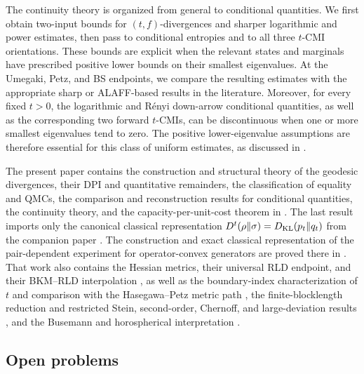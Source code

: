 \documentclass[11pt]{article}
\theoremstyle{remark}
\newcommand{\1}{\mathbbm{1}}
\begin{document}
The continuity theory is organized from general to conditional
quantities.  We first obtain two-input bounds for $(t,f)$-divergences
and sharper logarithmic and power estimates, then pass to conditional
entropies and to all three $t$-CMI orientations.  These bounds are
explicit when the relevant states and marginals have prescribed
positive lower bounds on their smallest eigenvalues.  At the Umegaki,
Petz, and BS endpoints, we compare the resulting estimates with the
appropriate sharp or ALAFF-based results in the literature.  Moreover,
for every fixed $t>0$, the logarithmic and R\'enyi down-arrow
conditional quantities, as well as the corresponding two forward
$t$-CMIs, can be discontinuous when one or more smallest eigenvalues
tend to zero.
The positive lower-eigenvalue assumptions are therefore essential for
this class of uniform estimates, as discussed in
.

The present paper contains the construction and structural theory of
the geodesic divergences, their DPI and quantitative remainders, the
classification of equality and QMCs, the comparison and reconstruction
results for conditional quantities, the continuity theory, and the
capacity-per-unit-cost theorem in .  The last
result imports only the canonical classical representation
$D^t(\rho\Vert\sigma)=D_{\rm KL}(p_t\Vert q_t)$ from the companion
paper
\cite[Theorem~3.1 and Proposition~3.3(i)]{capel2026informationgeometry}.
The construction and exact classical representation of the
pair-dependent experiment for operator-convex generators are proved
there in \cite[Theorem~3.1]{capel2026informationgeometry}.  That work
also contains the Hessian metrics, their universal RLD endpoint, and
their BKM--RLD interpolation
\cite[Theorem~2.3, Corollary~2.4, and Theorem~2.5]{capel2026informationgeometry},
as well as the boundary-index characterization of $t$ and comparison
with the Hasegawa--Petz metric path
\cite[Theorem~2.6 and Proposition~2.7]{capel2026informationgeometry},
the finite-blocklength reduction and restricted Stein, second-order,
Chernoff, and large-deviation results
\cite[Propositions~3.2--3.3]{capel2026informationgeometry}, and the
Busemann and horospherical interpretation
\cite[Propositions~4.1--4.2 and Section~4.3]{capel2026informationgeometry}.

\subsection{Open problems}
\end{document}
